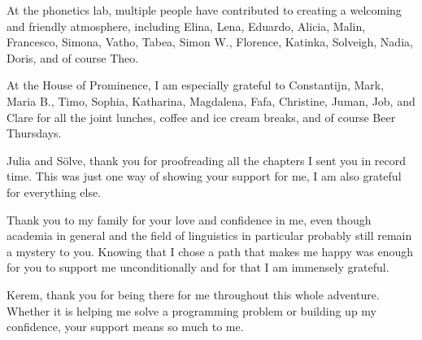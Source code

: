 At the phonetics lab, multiple people have contributed to creating a welcoming and friendly atmosphere, including Elina, Lena, Eduardo, Alicia, Malin, Francesco, Simona, Vatho, Tabea, Simon W., Florence, Katinka, Solveigh, Nadia, Doris, and of course Theo.

At the House of Prominence, I am especially grateful to Constantijn, Mark, Maria B., Timo, Sophia, Katharina, Magdalena, Fafa, Christine, Juman, Job, and Clare for all the joint lunches, coffee and ice cream breaks, and of course Beer Thursdays.

Julia and Sölve, thank you for proofreading all the chapters I sent you in record time. This was just one way of showing your support for me, I am also grateful for everything else.

Thank you to my family for your love and confidence in me, even though academia in general and the field of linguistics in particular probably still remain a mystery to you. Knowing that I chose a path that makes me happy was enough for you to support me unconditionally and for that I am immensely grateful.

Kerem, thank you for being there for me throughout this whole adventure. Whether it is helping me solve a programming problem or building up my confidence, your support means so much to me.
